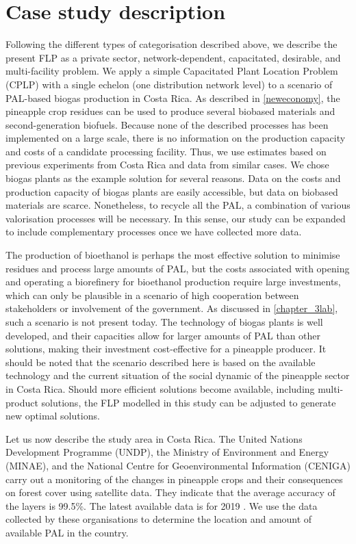 \section{Case study description}

Following the different types of categorisation described above, we describe the present FLP as a private sector, network-dependent, capacitated, desirable, and multi-facility problem. We apply a simple Capacitated Plant Location Problem (CPLP) with a single echelon (one distribution network level) to a scenario of PAL-based biogas production in Costa Rica. As described in \cref{neweconomy}, the pineapple crop residues can be used to produce several biobased materials and second-generation biofuels. Because none of the described processes has been implemented on a large scale, there is no information on the production capacity and costs of a candidate processing facility. Thus, we use estimates based on previous experiments from Costa Rica and data from similar cases. We chose biogas plants as the example solution for several reasons. Data on the costs and production capacity of biogas plants are easily accessible, but data on biobased materials are scarce. Nonetheless, to recycle all the PAL, a combination of various valorisation processes will be necessary. In this sense, our study can be expanded to include complementary processes once we have collected more data.

The production of bioethanol is perhaps the most effective solution to minimise residues and process large amounts of PAL, but the costs associated with opening and operating a biorefinery for bioethanol production require large investments, which can only be plausible in a scenario of high cooperation between stakeholders or involvement of the government. As discussed in \cref{chapter_3lab}, such a scenario is not present today. The technology of biogas plants is well developed, and their capacities allow for larger amounts of PAL than other solutions, making their investment cost-effective for a pineapple producer. It should be noted that the scenario described here is based on the available technology and the current situation of the social dynamic of the pineapple sector in Costa Rica. Should more efficient solutions become available, including multi-product solutions, the FLP modelled in this study can be adjusted to generate new optimal solutions. 

Let us now describe the study area in Costa Rica. The United Nations Development Programme (UNDP), the Ministry of Environment and Energy (MINAE), and the National Centre for Geoenvironmental Information (CENIGA) carry out a monitoring of the changes in pineapple crops and their consequences on forest cover using satellite data. They indicate that the average accuracy of the layers is 99.5\%. The latest available data is for 2019 \cite{SNITpina}. We use the data collected by these organisations to determine the location and amount of available PAL in the country.

